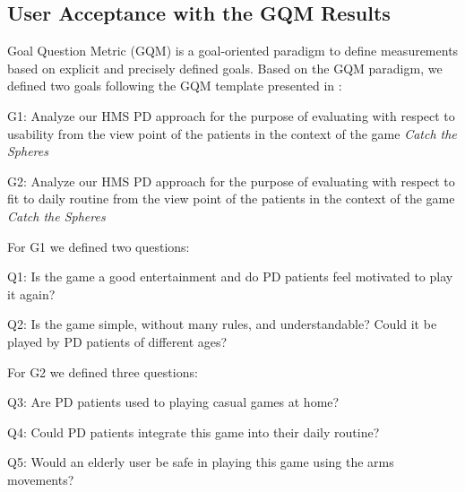 \documentclass[10pt, conference, compsocconf]{IEEEtran}
\begin{document}
\subsection{User Acceptance with the GQM Results}

Goal Question Metric (GQM) \cite{gqmhci2009} is a goal-oriented paradigm to define measurements based on explicit and precisely defined goals.  Based on the GQM paradigm, we defined two goals following the GQM template presented in \cite{gqmhci2009}: 


\begin{compactitem}
	\item G1: Analyze our HMS PD approach for the purpose of evaluating with respect to usability from the view point of the patients in the context of the game \emph{Catch the Spheres}
	\item G2: Analyze our HMS PD approach for the purpose of evaluating with respect to fit to daily routine from the view point of the patients in the context of the game \emph{Catch the Spheres}
\end{compactitem}

For G1 we defined two questions: 

\begin{compactitem}
	\item Q1: Is the game a good entertainment and do PD patients feel motivated to play it again?
	\item Q2: Is the game simple, without many rules, and understandable? Could it be played by PD patients of different ages? 
\end{compactitem}

For G2 we defined three questions:

\begin{compactitem}
	\item Q3: Are PD patients used to playing casual games at home?
	\item Q4: Could PD patients integrate this game into their daily routine?
	\item Q5: Would an elderly user be safe in playing this game using the arms movements?
\end{compactitem}
\end{document}
